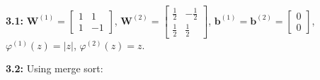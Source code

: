 \documentclass[12pt]{article}
\newcommand{\m}[1]{\mathbf{#1}}
\begin{document}
\textbf{3.1:} $\m{W}^{(1)} = \begin{bmatrix} 1 & 1 \\ 1 & -1 \end{bmatrix}$, $\m{W}^{(2)} = \begin{bmatrix} \frac{1}{2} & -\frac{1}{2} \\ \frac{1}{2} & \frac{1}{2} \end{bmatrix}$, $\m{b}^{(1)} = \m{b}^{(2)} = \begin{bmatrix} 0 \\ 0 \end{bmatrix}$, $\varphi^{(1)}(z) = |z|$, $\varphi^{(2)}(z) = z$.

\textbf{3.2:} Using merge sort: \begin{center}\end{center}
\end{document}
